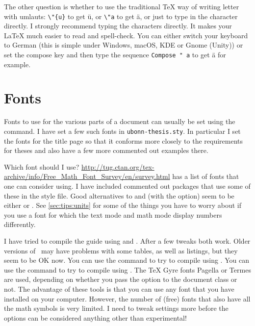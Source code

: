 The other question is whether to use the traditional \TeX{} way of
writing letter with umlauts: \verb+\"{u}+ to get \"{u}, or \verb+\"a+
to get \"a, or just to type in the character directly. I strongly
recommend typing the characters directly. It makes your \LaTeX{} much
easier to read and spell-check. You can either switch your keyboard to
German (this is simple under Windows, macOS, KDE or Gnome (Unity)) or set the
compose key and then type the sequence \texttt{Compose " a} to get ä for example. %


\section{Fonts}%
\label{sec:layout:font}

Fonts to use for the various parts of a
document can usually be set using the  command.
I have set a few such fonts in \texttt{ubonn-thesis.sty}.
In particular
I set the fonts for the title page so that it conforms more closely to
the requirements for theses and also have a few more commented out
examples there.

Which font should I use?
\url{http://tug.ctan.org/tex-archive/info/Free_Math_Font_Survey/en/survey.html}
has a list of fonts that one can consider using.
I have included
commented out packages that use some of these in the style file.
Good alternatives to  and  (with the  option) seem
to be either  or .
See \cref{sec:tips:units} for some of the things you have to worry
about if you use a font for which the text mode and math mode display
numbers differently.

I have tried to compile the guide using \XeLaTeX{} and \LuaLaTeX{}.
After a few tweaks both work.
Older versions of \LuaLaTeX\ may have problems with some tables, as well as listings,
but they seem to be OK now.
You can use the command  to try to compile using \XeLaTeX.
You can use the command  to try to compile using \LuaLaTeX.
The TeX Gyre fonts Pagella or Termes are used, depending on whether you pass the
 option to the document class or not.
The advantage of these tools is that you can use any font that you have installed on your computer.
However, the number of (free) fonts that also have all the math symbols is very limited.
I need to tweak settings more before the options can be considered anything other than experimental!


